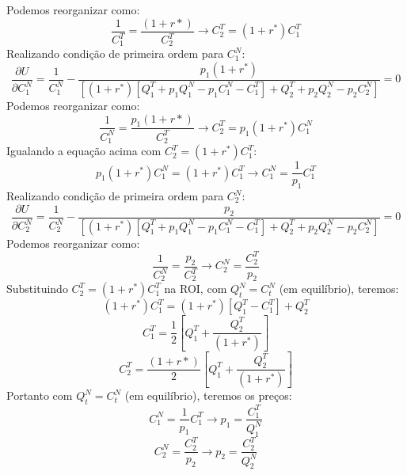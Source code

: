 \documentclass{article}
\begin{document}
Podemos reorganizar como:
\begin{equation*}
    \frac{1}{C_1^T}=\frac{(1+r*)}{C_2^T} \to C_2^T = (1+r^*)C_1^T
\end{equation*}
Realizando condição de primeira ordem para $C_1^N$:
\begin{equation*}
    \frac{\partial U}{\partial C_1^N}=\frac{1}{C_1^N}-\frac{p_1(1+r^*)}{\left[(1+r^*)\left[Q_1^T + p_1 Q_1^N- p_1 C_1^N-C_1^T \right] + Q_2^T + p_2 Q_2^N- p_2 C_2^N\right]}=0
\end{equation*}
Podemos reorganizar como:
\begin{equation*}
    \frac{1}{C_1^N}=\frac{p_1(1+r*)}{C_2^T} \to C_2^T = p_1(1+r^*)C_1^N
\end{equation*}
Igualando a equação acima com $C_2^T=(1+r^*)C_1^T$:
\begin{equation*}
    p_1(1+r^*)C_1^N=(1+r^*)C_1^T \to C_1^N = \frac{1}{p_1}C_1^T
\end{equation*}
Realizando condição de primeira ordem para $C_2^N$:
\begin{equation*}
    \frac{\partial U}{\partial C_2^N}=\frac{1}{C_2^N}-\frac{p_2}{\left[(1+r^*)\left[Q_1^T + p_1 Q_1^N- p_1 C_1^N-C_1^T \right] + Q_2^T + p_2 Q_2^N- p_2 C_2^N\right]}=0
\end{equation*}
Podemos reorganizar como:
\begin{equation*}
    \frac{1}{C_2^N}=\frac{p_2}{C_2^T} \to C_2^N = \frac{C_2^T}{p_2}
\end{equation*}
Substituindo $C_2^T=(1+r^*)C_1^T$ na ROI, com $Q_t^N=C_t^N$ (em equilíbrio), teremos:
\begin{equation*}
     (1+r^*)C_1^T = (1+r^*)\left[Q_1^T-C_1^T \right] + Q_2^T
\end{equation*}
\begin{equation*}
     C_1^T = \frac{1}{2}\left[Q_1^T  + \frac{Q_2^T}{(1+r^*)}\right]
\end{equation*}
\begin{equation*}
     C_2^T = \frac{(1+r*)}{2}\left[Q_1^T  + \frac{Q_2^T}{(1+r^*)}\right]
\end{equation*}
Portanto com $Q_t^N=C_t^N$ (em equilíbrio), teremos os preços:
\begin{equation*}
    C_1^N = \frac{1}{p_1}C_1^T \to p_1 = \frac{C_1^T}{Q_1^N}
\end{equation*}
\begin{equation*}
    C_2^N = \frac{C_2^T}{p_2} \to p_2 = \frac{C_2^T}{Q_2^N}
\end{equation*}
\newpage
\end{document}
